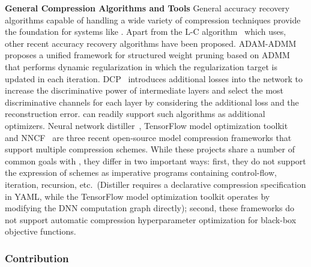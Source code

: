 \noindent \textbf{General Compression Algorithms and Tools} General accuracy recovery algorithms capable of handling a wide variety of compression techniques provide the foundation for systems like \algoName. Apart from the L-C algorithm~\cite{carreira2017model} which \algoName uses, other recent accuracy recovery algorithms have been proposed. ADAM-ADMM~\cite{zhang2018adam} proposes a unified framework for structured weight pruning based on ADMM that performs dynamic regularization in which the regularization target is updated in each iteration. DCP~\cite{zhuang2018discrimination} introduces additional losses into the network to increase the discriminative power of intermediate layers and select the most discriminative channels for each layer by considering the additional loss and the reconstruction error. \algoName can readily support such algorithms as additional optimizers. Neural network distiller~\cite{neta_zmora_2018_1297430}, TensorFlow model optimization toolkit~\cite{tftoolkit} {\color{black} and NNCF~\cite{kozlov2020neural} are three recent open-source model compression frameworks that support multiple compression schemes.} While these projects share a number of common goals with \algoName, they differ in two important ways: first, they do not support the expression of schemes as imperative programs containing control-flow, iteration, recursion, etc.~(Distiller requires a declarative compression specification in YAML, while the TensorFlow model optimization toolkit operates by modifying the DNN computation graph directly); second, these frameworks do not support automatic compression hyperparameter optimization for black-box objective functions.

\subsubsection{Contribution}

